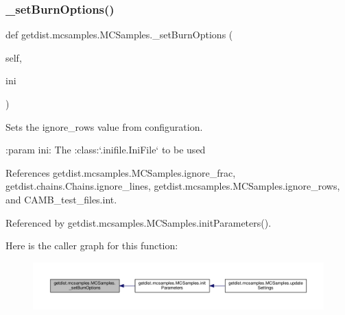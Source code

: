 \subsubsection{\texorpdfstring{\+\_\+set\+Burn\+Options()}{\_setBurnOptions()}}
{\footnotesize\ttfamily def getdist.\+mcsamples.\+M\+C\+Samples.\+\_\+set\+Burn\+Options (\begin{DoxyParamCaption}\item[{}]{self,  }\item[{}]{ini }\end{DoxyParamCaption})\hspace{0.3cm}{\ttfamily [private]}}

\begin{DoxyVerb}Sets the ignore_rows value from configuration.

:param ini: The :class:`.inifile.IniFile` to be used
\end{DoxyVerb}
 

References getdist.\+mcsamples.\+M\+C\+Samples.\+ignore\+\_\+frac, getdist.\+chains.\+Chains.\+ignore\+\_\+lines, getdist.\+mcsamples.\+M\+C\+Samples.\+ignore\+\_\+rows, and C\+A\+M\+B\+\_\+test\+\_\+files.\+int.



Referenced by getdist.\+mcsamples.\+M\+C\+Samples.\+init\+Parameters().

Here is the caller graph for this function\+:
\nopagebreak
\begin{figure}[H]
\begin{center}
\leavevmode
\includegraphics[width=350pt]{classgetdist_1_1mcsamples_1_1MCSamples_a6cbc5f8ec4356d9ef56c6858a88d9ed6_icgraph}
\end{center}
\end{figure}
\mbox{\label{classgetdist_1_1mcsamples_1_1MCSamples_ae22105031ef07db6d65ce05fef3b15e8}} 
